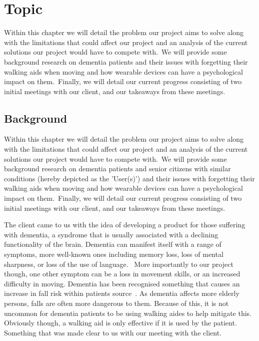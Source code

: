 \chapter{Topic} \label{ch:topic}

        Within this chapter we will detail the problem our project aims to solve along with the limitations that could
        affect our project and an analysis of the current solutions our project would have to compete with.\ We will
        provide some background research on dementia patients and their issues with forgetting their walking aids when
        moving and how wearable devices can have a psychological impact on them.\ Finally, we will detail our current
        progress consisting of two initial meetings with our client, and our takeaways from these meetings.

    \section{Background}

        Within this chapter we will detail the problem our project aims to solve along with the limitations that could
        affect our project and an analysis of the current solutions our project would have to compete with.\ We will
        provide some background research on dementia patients and senior citizens with similar conditions (hereby
        depicted as the 'User(s)') and their issues with forgetting their walking aids when moving and how wearable
        devices can have a psychological impact on them.\ Finally, we will detail our current progress consisting of two
        initial meetings with our client, and our takeaways from these meetings.

        The client came to us with the idea of developing a product for those suffering with dementia, a syndrome that
        is usually associated with a declining functionality of the brain. Dementia can manifest itself with a range of
        symptoms, more well-known ones including memory loss, loss of mental sharpness, or loss of the use of
        language.~\cite{nhs_choices} More importantly to our project though, one other symptom can be a loss in movement
        skills, or an increased difficulty in moving. Dementia has been recognised something that causes an increase in
        fall risk within patients
        source~\cite{doorn_gruber-baldini_zimmerman_hebel_port_baumgarten_quinn_taler_may_magaziner_et_al._2003}. As
        dementia affects more elderly persons, falls are often more dangerous to them. Because of this, it is not
        uncommon for dementia patients to be using walking aides to help mitigate this. Obviously though, a walking aid
        is only effective if it is used by the patient. Something that was made clear to us with our meeting with the
        client.


